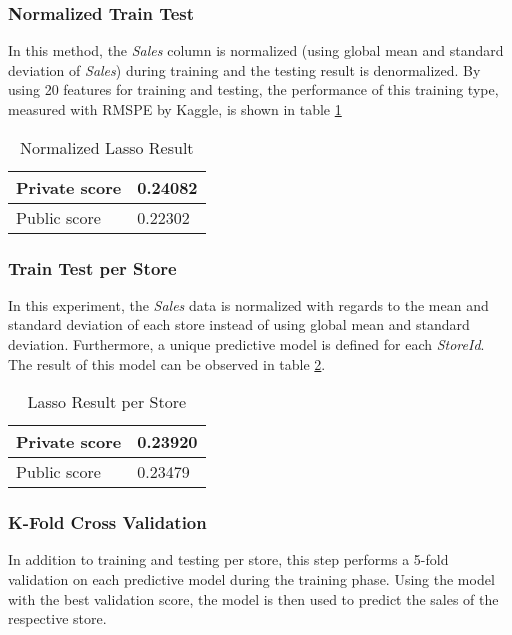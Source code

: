 \subsubsection{Normalized Train Test}
In this method, the \textit{Sales} column is normalized (using global mean and standard deviation of \textit{Sales}) during training and the testing result is denormalized. 
By using 20 features for training and testing, the performance of this training type, measured with RMSPE by Kaggle, is shown in table \ref{tab:lasso_norm_result}
\begin{table}[h]
	\centering
	\caption{Normalized Lasso Result}
	\label{tab:lasso_norm_result}
	\begin{tabular}{|m{100pt}|m{50pt}|}
		\hline
		Private score & 0.24082 \\ \hline
		Public score  & 0.22302 \\ \hline
	\end{tabular}
\end{table}

\subsubsection{Train Test per Store}
In this experiment, the \textit{Sales} data is normalized with regards to the mean and standard deviation of each store instead of using global mean and standard deviation. Furthermore, a unique predictive model is defined for each \textit{StoreId}.\\
The result of this model can be observed in table \ref{tab:lasso_result_per_store}.

\begin{table}[h]
	\centering
	\caption{Lasso Result per Store}
	\label{tab:lasso_result_per_store}
	\begin{tabular}{|m{100pt}|m{50pt}|}
		\hline
		Private score & 0.23920 \\ \hline
		Public score  & 0.23479 \\ \hline
	\end{tabular}
\end{table}

\subsubsection{K-Fold Cross Validation}
In addition to training and testing per store, this step performs a 5-fold validation on each predictive model during the training phase. Using the model with the best validation score, the model is then used to predict the sales of the respective store.

